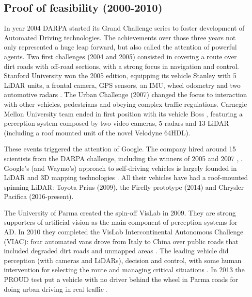 \documentclass[journal]{IEEEtran}
\begin{document}
\subsection{Proof of feasibility (2000-2010)}

In year 2004 DARPA started its Grand Challenge series to foster development of
Automated Driving technologies. The achievements over those three years 
not only represented a huge leap forward, but also called the attention of
powerful agents.
Two first challenges (2004 and 2005) consisted in covering a route over dirt
roads with off-road sections, with a strong focus in navigation and control.
Stanford University won the 2005 edition, equipping its vehicle Stanley with
5 LiDAR units, a frontal camera, GPS sensors, an IMU, wheel odometry and two 
automotive radars \cite{Thrun2006}. 
The Urban Challenge (2007) changed the focus to interaction with other vehicles,
pedestrians and obeying complex traffic regulations. Carnegie Mellon University
team ended in first position with its vehicle Boss 
\cite{TartanRacing2005, Urmson2007}, 
featuring a perception system composed by two video cameras, 5 radars and 13
LiDAR (including a roof mounted unit of the novel Velodyne 64HDL).

These events triggered the attention of Google. 
The company hired around 15 scientists from the DARPA challenge, 
including the winners of 2005 and 2007 \cite{Montemerlo2008}, 
\cite{Levinson2011}. Google's (and Waymo's) approach to self-driving vehicles
is largely founded in LiDAR and 3D mapping technologies \cite{Chapell2016}. 
All their vehicles have had a roof-mounted spinning LiDAR: Toyota Prius (2009),
the Firefly prototype (2014) and Chrysler Pacifica (2016-present).

The University of Parma created the spin-off VisLab in 2009. 
They are strong supporters of artificial vision as the main component of 
perception systems for AD. 
In 2010 they completed the VisLab Intercontinental Autonomous 
Challenge (VIAC): four automated vans drove from Italy to China over public 
roads that included degraded dirt roads and unmapped areas \cite{Bertozzi2011}.
The leading vehicle did perception (with cameras and LiDARs), decision and 
control, with some human intervention for selecting the route and managing 
critical situations \cite{Broggi2012}. 
In 2013 the PROUD test put a vehicle with no driver behind the wheel in Parma 
roads for doing urban driving in real traffic \cite{Broggi2013}. 
\end{document}
